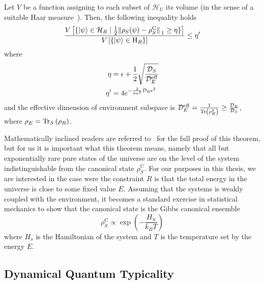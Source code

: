 \begin{theorem}
	Let \(V\) be a function assigning to each subset of \(\mathcal{H}_U\) its volume (in the sense of a suitable Haar measure~\autocite{VitaliD.Milman1986}).
	Then, the following inequality holds
	\begin{equation}
		\frac{V\left[\{\ket{\psi}\in\mathcal{H}_R \mid \frac{1}{2}\norm*{\rho_S(\psi) - \rho_S^{\mathrm{C}}}_1\geq \eta\}\right]}
		{V\left[\{\ket{\psi}\in \mathrm{H}_R\}\right]} \leq \eta^{\prime}
	\end{equation}
	where 
	\begin{align*}
		\eta &= \epsilon + \frac{1}{2}\sqrt{\frac{\mathcal{D}_S}{\mathcal{D}_E^{\mathrm{eff}}}}\\
		\eta^{\prime} &= 4 e^{-\frac{2}{9\pi^3} \mathcal{D}_R \epsilon^2 }
	\end{align*}
	and the effective dimension of environment subspace is \(\mathcal{D}_E^{\mathrm{eff}} = 
	\frac{1}{\Tr\left(\rho_E^2\right)}\geq \frac{\mathcal{D}_R}{\mathcal{D}_S}\), where \(\rho_E = \Tr_S\left(\rho_R\right)\).
\end{theorem}
Mathematically inclined readers are
referred to~\textcite{Popescu2006a} for the full proof of this theorem, but for us it is important
what this theorem means, namely that all but exponentially rare pure states of the universe are on the level of the system
indistinguishable from the canonical state \(\rho_S^{\mathrm{C}}\). 
For our purposes in this thesis, we are interested in the case were the constraint \(R\) is that the total energy
in the universe is close to some fixed value \(E\). Assuming that the systems is weakly coupled with the environment, it
becomes a standard exercise in statistical mechanics to show that the canonical state is the Gibbs canonical ensemble
\begin{equation}
	\rho_S^{\mathrm{C}} \propto \exp\left(-\frac{H_S}{k_B T}\right)
\end{equation}
where \(H_s\) is the Hamiltonian of the system and \(T\) is the temperature set by the energy \(E\).


\subsection{\label{sec:DQT} Dynamical Quantum Typicality}

